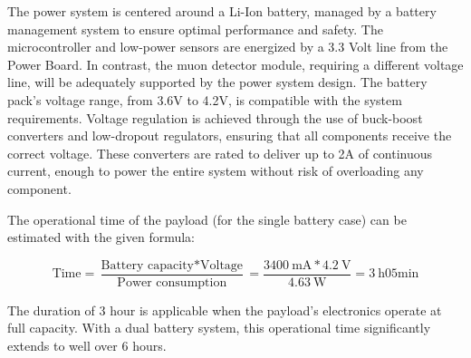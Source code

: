 The power system is centered around a Li-Ion battery, managed by a battery management system to ensure optimal performance and safety. The microcontroller and low-power sensors are energized by a 3.3 Volt line from the Power Board. In contrast, the muon detector module, requiring a different voltage line, will be adequately supported by the power system design. The battery pack's voltage range, from 3.6V to 4.2V, is compatible with the system requirements. Voltage regulation is achieved through the use of buck-boost converters and low-dropout regulators, ensuring that all components receive the correct voltage. These converters are rated to deliver up to 2A of continuous current, enough to power the entire system without risk of overloading any component.

The operational time of the payload (for the single battery case) can be estimated with the given formula:

\begin{equation*}
\text{Time} = \frac{\text{Battery capacity} * \text{Voltage}}{\text{Power consumption}}=\frac{\SI{3400}{\milli\ampere} * \SI{4.2}{\volt}}{\SI{4.63}{\watt}} = \SI{3}{\hour} 
 05\text{min}
\end{equation*}

The duration of 3 hour is applicable when the payload's electronics operate at full capacity. With a dual battery system, this operational time significantly extends to well over 6 hours.

